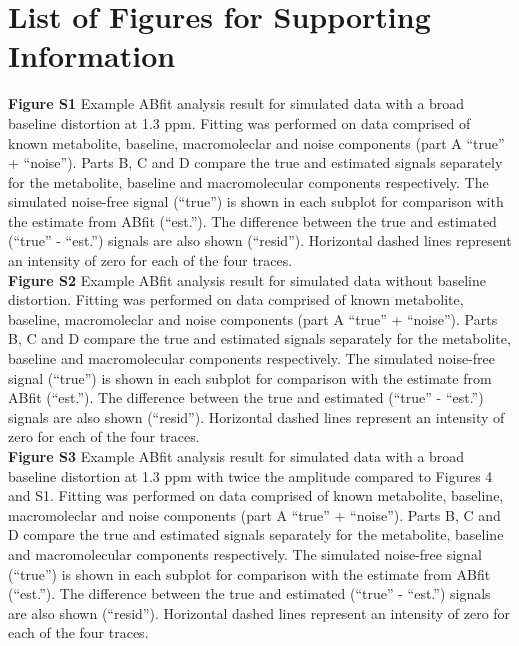 \documentclass[num-refs]{wiley-article}
\begin{document}


\clearpage
\listoffigures

\section*{List of Figures for Supporting Information}
\textbf{Figure S1} Example ABfit analysis result for simulated data with a broad baseline distortion at 1.3 ppm. Fitting was performed on data comprised of known metabolite, baseline, macromoleclar and noise components (part A ``true'' + ``noise''). Parts B, C and D compare the true and estimated signals separately for the metabolite, baseline and macromolecular components respectively. The simulated noise-free signal (``true'') is shown in each subplot for comparison with the estimate from ABfit (``est.''). The difference between the true and estimated (``true'' - ``est.'') signals are also shown (``resid''). Horizontal dashed lines represent an intensity of zero for each of the four traces.\\
\textbf{Figure S2} Example ABfit analysis result for simulated data without baseline distortion. Fitting was performed on data comprised of known metabolite, baseline, macromoleclar and noise components (part A ``true'' + ``noise''). Parts B, C and D compare the true and estimated signals separately for the metabolite, baseline and macromolecular components respectively. The simulated noise-free signal (``true'') is shown in each subplot for comparison with the estimate from ABfit (``est.''). The difference between the true and estimated (``true'' - ``est.'') signals are also shown (``resid''). Horizontal dashed lines represent an intensity of zero for each of the four traces.\\
\textbf{Figure S3} Example ABfit analysis result for simulated data with a broad baseline distortion at 1.3 ppm with twice the amplitude compared to Figures 4 and S1. Fitting was performed on data comprised of known metabolite, baseline, macromoleclar and noise components (part A ``true'' + ``noise''). Parts B, C and D compare the true and estimated signals separately for the metabolite, baseline and macromolecular components respectively. The simulated noise-free signal (``true'') is shown in each subplot for comparison with the estimate from ABfit (``est.''). The difference between the true and estimated (``true'' - ``est.'') signals are also shown (``resid''). Horizontal dashed lines represent an intensity of zero for each of the four traces.\\
\end{document}
